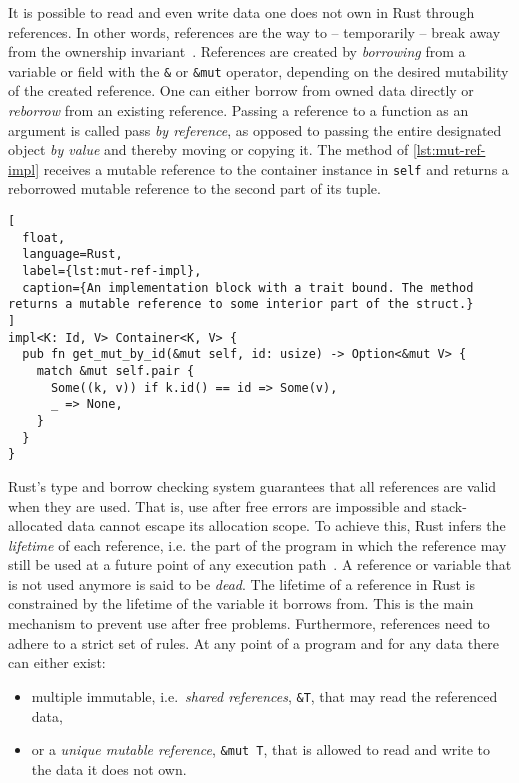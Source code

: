 It is possible to read and even write data one does not own in Rust through
references. In other words, references are the way to -- temporarily -- break
away from the ownership invariant~\cite{lightweight-formalism}. References are
created by \emph{borrowing} from a variable or field with the \lstinline!&! or
\lstinline!&mut! operator, depending on the desired mutability of the created
reference. One can either borrow from owned data directly or \emph{reborrow}
from an existing reference. Passing a reference to a function as an argument is
called pass \emph{by reference}, as opposed to passing the entire designated
object \emph{by value} and thereby moving or copying it. The method of
\autoref{lst:mut-ref-impl} receives a mutable reference to the container
instance in \lstinline!self! and returns a reborrowed mutable reference to the
second part of its tuple.

\begin{lstlisting}[
  float,
  language=Rust,
  label={lst:mut-ref-impl},
  caption={An implementation block with a trait bound. The method returns a mutable reference to some interior part of the struct.}
]
impl<K: Id, V> Container<K, V> {
  pub fn get_mut_by_id(&mut self, id: usize) -> Option<&mut V> {
    match &mut self.pair {
      Some((k, v)) if k.id() == id => Some(v),
      _ => None,
    }
  }
}
\end{lstlisting}

Rust's type and borrow checking system guarantees that all references are valid
when they are used. That is, use after free errors are impossible and
stack-allocated data cannot escape its allocation scope. To achieve this, Rust
infers the \emph{lifetime} of each reference, i.e. the part of the program in
which the reference may still be used at a future point of any execution
path~\cite{wiki:live-vars}. A reference or variable that is not used anymore is
said to be \emph{dead}. The lifetime of a reference in Rust is constrained by
the lifetime of the variable it borrows from. This is the main  mechanism to
prevent use after free problems. Furthermore, references need to adhere to a
strict set of rules. At any point of a program and for any data there can either
exist:


\begin{itemize}
\tightlist
\item multiple immutable, i.e.~\emph{shared references}, \lstinline!&T!,  that
may read the referenced data,

\item or a \emph{unique mutable reference}, \passthrough{\lstinline!&mut T!},
that is allowed to read and write to the data it does not own.
\end{itemize}

